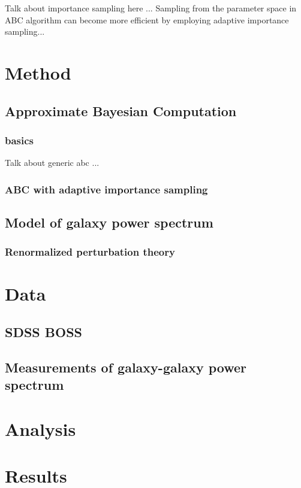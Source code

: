 \documentclass[12pt, preprint]{aastex}
\begin{document}
Talk about importance sampling here ...
Sampling from the parameter space in ABC algorithm can become more efficient by 
employing adaptive importance sampling... 

\section{Method}

\subsection{Approximate Bayesian Computation}

\subsubsection{basics}

Talk about generic abc ...

\subsubsection{ABC with adaptive importance sampling}



\subsection{Model of galaxy power spectrum}


\subsubsection{Renormalized perturbation theory}

\section{Data}

\subsection{SDSS BOSS}

\subsection{Measurements of galaxy-galaxy power spectrum}

\section{Analysis}

\section{Results}


\begin{thebibliography}{70}

\end{thebibliography}
\end{document}
